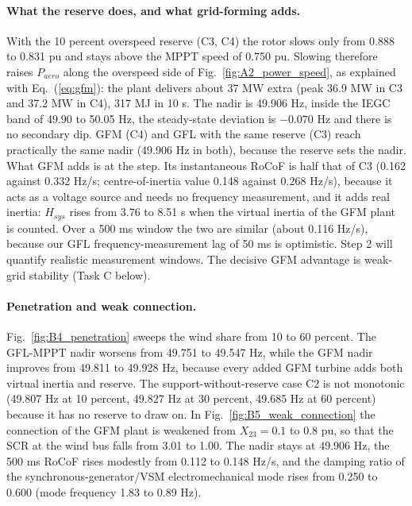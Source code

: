 \paragraph{What the reserve does, and what grid-forming adds.} With the 10 percent overspeed reserve (C3, C4) the rotor slows only from 0.888 to 0.831 pu and stays above the MPPT speed of 0.750 pu. Slowing therefore raises $P_{aero}$ along the overspeed side of Fig.~\ref{fig:A2_power_speed}, as explained with Eq.~(\ref{eq:gfm}): the plant delivers about 37 MW extra (peak 36.9 MW in C3 and 37.2 MW in C4), 317 MJ in 10 s. The nadir is 49.906 Hz, inside the IEGC band of 49.90 to 50.05 Hz, the steady-state deviation is $-0.070$ Hz and there is no secondary dip. GFM (C4) and GFL with the same reserve (C3) reach practically the same nadir (49.906 Hz in both), because the reserve sets the nadir. What GFM adds is at the step. Its instantaneous RoCoF is half that of C3 (0.162 against 0.332 Hz/s; centre-of-inertia value 0.148 against 0.268 Hz/s), because it acts as a voltage source and needs no frequency measurement, and it adds real inertia: $H_{sys}$ rises from 3.76 to 8.51 s when the virtual inertia of the GFM plant is counted. Over a 500 ms window the two are similar (about 0.116 Hz/s), because our GFL frequency-measurement lag of 50 ms is optimistic. Step 2 will quantify realistic measurement windows. The decisive GFM advantage is weak-grid stability (Task C below).

\paragraph{Penetration and weak connection.} Fig.~\ref{fig:B4_penetration} sweeps the wind share from 10 to 60 percent. The GFL-MPPT nadir worsens from 49.751 to 49.547 Hz, while the GFM nadir improves from 49.811 to 49.928 Hz, because every added GFM turbine adds both virtual inertia and reserve. The support-without-reserve case C2 is not monotonic (49.807 Hz at 10 percent, 49.827 Hz at 30 percent, 49.685 Hz at 60 percent) because it has no reserve to draw on. In Fig.~\ref{fig:B5_weak_connection} the connection of the GFM plant is weakened from $X_{23}=0.1$ to $0.8$ pu, so that the SCR at the wind bus falls from 3.01 to 1.00. The nadir stays at 49.906 Hz, the 500 ms RoCoF rises modestly from 0.112 to 0.148 Hz/s, and the damping ratio of the synchronous-generator/VSM electromechanical mode rises from 0.250 to 0.600 (mode frequency 1.83 to 0.89 Hz).
